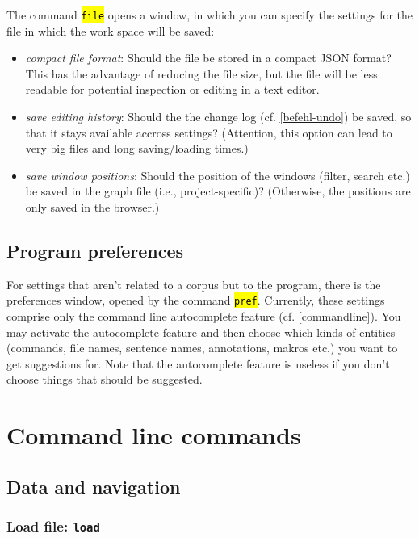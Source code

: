 \documentclass[12pt]{scrartcl}
\newcommand{\code}[1]{\hl{\texttt{#1}}}
\begin{document}
The command \code{file} opens a window, in which you can specify the settings for the file in which the work space will be saved:

\begin{itemize}
	\item	\textit{compact file format}: Should the file be stored in a compact JSON format?
			This has the advantage of reducing the file size, but the file will be less readable for potential inspection or editing in a text editor.
	\item	\textit{save editing history}: Should the the change log (cf. \ref{befehl-undo}) be saved, so that it stays available accross settings?
			(Attention, this option can lead to very big files and long saving/loading times.)
	\item	\textit{save window positions}: Should the position of the windows (filter, search etc.) be saved in the graph file (i.e., project-specific)?
			(Otherwise, the positions are only saved in the browser.)
\end{itemize}


\subsection{Program preferences}\label{preferences}

For settings that aren’t related to a corpus but to the program, there is the preferences window, opened by the command \code{pref}.
Currently, these settings comprise only the command line autocomplete feature (cf. \ref{commandline}).
You may activate the autocomplete feature and then choose which kinds of entities (commands, file names, sentence names, annotations, makros etc.) you want to get suggestions for.
Note that the autocomplete feature is useless if you don’t choose things that should be suggested.



\section{Command line commands}\label{commandline-commands}

\subsection{Data and navigation}

\subsubsection{Load file: \texttt{load}}
\end{document}
